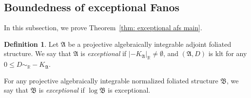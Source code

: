 \documentclass[11pt,reqno]{amsart}
\numberwithin{equation}{section}
\newcommand{\Aa}{{\mathfrak{A}}}
\newcommand{\Bb}{{\mathfrak{B}}}
\theoremstyle{definition}
\newtheorem{defn}[thm]{Definition}
\begin{document}
\subsection{Boundedness of exceptional Fanos}

In this subsection, we prove Theorem~\ref{thm: exceptional afs main}.

\begin{defn}
Let $\Aa$ be a projective algebraically integrable adjoint foliated structure. We say that $\Aa$ is \emph{exceptional} if $|-K_{\Aa}|_{\mathbb R}\neq\emptyset$, and $(\Aa,D)$ is klt for any $0\leq D\sim_{\mathbb R}-K_{\Aa}$.

For any projective algebraically integrable normalized foliated structure $\Bb$, we say that $\Bb$ is \emph{exceptional} if $\log\Bb$ is exceptional.
\end{defn}
\end{document}
